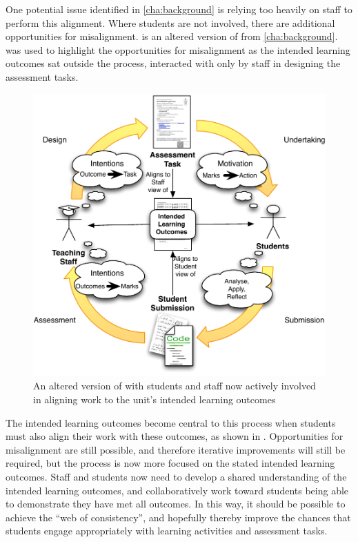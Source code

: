 One potential issue identified in \cref{cha:background} is relying too heavily on staff to perform this alignment. Where students are not involved, there are additional opportunities for misalignment.  is an altered version of  from \cref{cha:background}.  was used to highlight the opportunities for misalignment as the intended learning outcomes sat outside the process, interacted with only by staff in designing the assessment tasks. 

\begin{figure}[htbp]
	\centering
	\includegraphics[width=\textwidth]{Alignment}
	\caption{An altered version of  with students and staff now actively involved in aligning work to the unit's intended learning outcomes}
	\label{fig:alignment}
\end{figure}

The intended learning outcomes become central to this process when students must also align their work with these outcomes, as shown in . Opportunities for misalignment are still possible, and therefore iterative improvements will still be required, but the process is now more focused on the stated intended learning outcomes. Staff and students now need to develop a shared understanding of the intended learning outcomes, and collaboratively work toward students being able to demonstrate they have met all outcomes. In this way, it should be possible to achieve the ``web of consistency'', and hopefully thereby improve the chances that students engage appropriately with learning activities and assessment tasks. 

